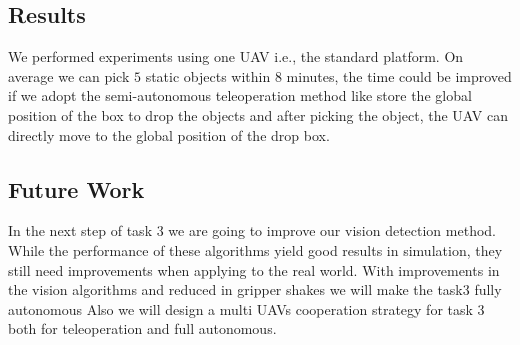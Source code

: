 \documentclass{standalone}
\begin{document}


\subsection{Results}

We performed experiments using one UAV i.e., the standard platform. 
On average we can pick $5$ static objects within $8$ minutes, the time
could be improved if we adopt the
semi-autonomous teleoperation method like store the global position of
the box to drop the objects and after picking the object, the UAV can
directly move to the global position of the drop box.


\subsection{Future Work}
In the next step of task 3 we are going to improve our vision
detection method. While the performance of these algorithms yield good
results in simulation, they still need improvements when applying to
the real world. With improvements in the vision algorithms and reduced
in gripper shakes we will make the task3 fully autonomous 
Also we will design a multi UAVs cooperation strategy for
task 3 both for teleoperation and full autonomous.
\end{document}
